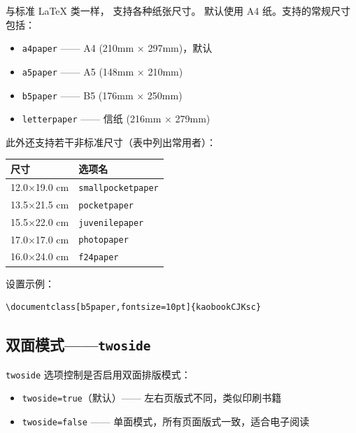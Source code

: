 与标准 \LaTeX{} 类一样， 支持各种纸张尺寸。
默认使用 A4 纸。支持的常规尺寸包括：

\begin{itemize}
    \item \texttt{a4paper} —— A4 (210mm × 297mm)，默认
    \item \texttt{a5paper} —— A5 (148mm × 210mm)
    \item \texttt{b5paper} —— B5 (176mm × 250mm)
    \item \texttt{letterpaper} —— 信纸 (216mm × 279mm)
\end{itemize}

此外还支持若干非标准尺寸（表中列出常用者）：

\begin{margintable}[-4cm]
\caption{kaobook 支持的特殊纸张尺寸}
\small
\begin{tabular}{@{}ll@{}}
\toprule
尺寸 & 选项名 \\
\midrule
12.0×19.0 cm & \texttt{smallpocketpaper} \\
13.5×21.5 cm & \texttt{pocketpaper} \\
15.5×22.0 cm & \texttt{juvenilepaper} \\
17.0×17.0 cm & \texttt{photopaper} \\
16.0×24.0 cm & \texttt{f24paper} \\
\bottomrule
\end{tabular}
\end{margintable}

设置示例：
\begin{lstlisting}
\documentclass[b5paper,fontsize=10pt]{kaobookCJKsc}
\end{lstlisting}

\subsection{双面模式——\texttt{twoside}}


\texttt{twoside} 选项控制是否启用双面排版模式：

\begin{itemize}
    \item \texttt{twoside=true}（默认）—— 左右页版式不同，类似印刷书籍
    \item \texttt{twoside=false} —— 单面模式，所有页面版式一致，适合电子阅读
\end{itemize}

